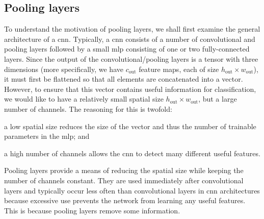 \documentclass[../report.tex]{subfiles}
\begin{document}
\subsection{Pooling layers}
To understand the motivation of pooling layers, we shall first examine the general architecture of a \gls{cnn}.
Typically, a \gls{cnn} consists of a number of convolutional and pooling layers followed by a small \gls{mlp} consisting of one or two fully-connected layers.
Since the output of the convolutional/pooling layers is a tensor with three dimensions (more specifically, we have $c_\text{out}$ feature maps, each of size $h_\text{out} \times w_\text{out}$), it must first be flattened so that all elements are concatenated into a vector.
However, to ensure that this vector contains useful information for classification, we would like to have a relatively small spatial size $h_\text{out} \times w_\text{out}$, but a large number of channels. 
The reasoning for this is twofold:
\begin{enumerate*}[label=(\roman*)]
    \item a low spatial size reduces the size of the vector and thus the number of trainable parameters in the \gls{mlp}; and
    \item a high number of channels allows the \gls{cnn} to detect many different useful features. 
\end{enumerate*}
Pooling layers provide a means of reducing the spatial size while keeping the number of channels constant.
They are used immediately after convolutional layers and typically occur less often than convolutional layers in \gls{cnn} architectures because excessive use prevents the network from learning any useful features.
This is because pooling layers remove some information.
\end{document}
